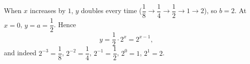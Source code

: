 When $x$ increases by $1$, $y$ doubles every time ($\dfrac{1}{8}\to\dfrac{1}{4}\to\dfrac{1}{2}\to1\to2$), so $b=2$. At $x=0$, $y=a=\dfrac{1}{2}$. Hence
\[
\boxed{y=\dfrac{1}{2}\cdot2^x=2^{x-1}},
\]
and indeed $2^{-3}=\dfrac{1}{8}$, $2^{-2}=\dfrac{1}{4}$, $2^{-1}=\dfrac{1}{2}$, $2^0=1$, $2^1=2$.
